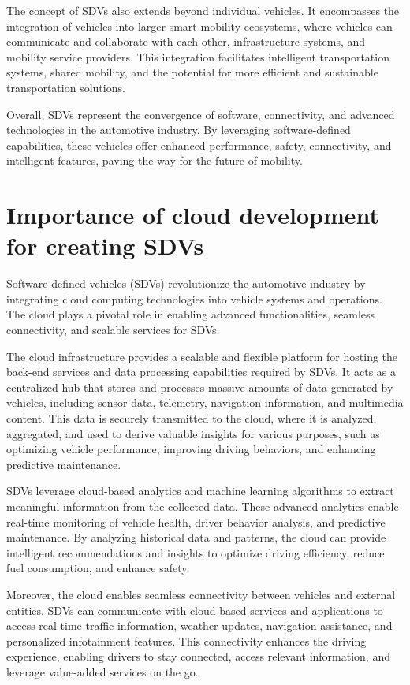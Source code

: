 \documentclass[
12pt,
oneside, 
onehalfspacing, 
nolistspacing, 
parskip, 
chapterinoneline, 
]{AASTCOMPUTER}
\begin{document}
The concept of SDVs also extends beyond individual vehicles. It encompasses the integration of vehicles into larger smart mobility ecosystems, where vehicles can communicate and collaborate with each other, infrastructure systems, and mobility service providers. This integration facilitates intelligent transportation systems, shared mobility, and the potential for more efficient and sustainable transportation solutions.

Overall, SDVs represent the convergence of software, connectivity, and advanced technologies in the automotive industry. By leveraging software-defined capabilities, these vehicles offer enhanced performance, safety, connectivity, and intelligent features, paving the way for the future of mobility.

\section{Importance of cloud development for creating SDVs}
Software-defined vehicles (SDVs) revolutionize the automotive industry by integrating cloud computing technologies into vehicle systems and operations. The cloud plays a pivotal role in enabling advanced functionalities, seamless connectivity, and scalable services for SDVs.

The cloud infrastructure provides a scalable and flexible platform for hosting the back-end services and data processing capabilities required by SDVs. It acts as a centralized hub that stores and processes massive amounts of data generated by vehicles, including sensor data, telemetry, navigation information, and multimedia content. This data is securely transmitted to the cloud, where it is analyzed, aggregated, and used to derive valuable insights for various purposes, such as optimizing vehicle performance, improving driving behaviors, and enhancing predictive maintenance.



SDVs leverage cloud-based analytics and machine learning algorithms to extract meaningful information from the collected data. These advanced analytics enable real-time monitoring of vehicle health, driver behavior analysis, and predictive maintenance. By analyzing historical data and patterns, the cloud can provide intelligent recommendations and insights to optimize driving efficiency, reduce fuel consumption, and enhance safety.

Moreover, the cloud enables seamless connectivity between vehicles and external entities. SDVs can communicate with cloud-based services and applications to access real-time traffic information, weather updates, navigation assistance, and personalized infotainment features. This connectivity enhances the driving experience, enabling drivers to stay connected, access relevant information, and leverage value-added services on the go.
\end{document}
